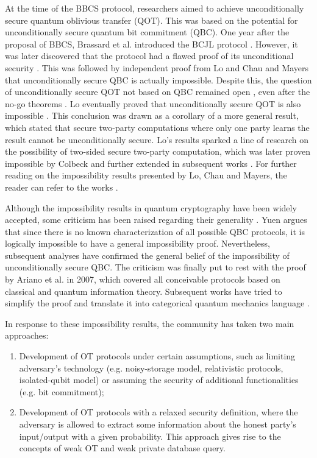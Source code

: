 At the time of the BBCS protocol, researchers aimed to achieve unconditionally secure quantum oblivious transfer (QOT). This was based on the potential for unconditionally secure quantum bit commitment (QBC). One year after the proposal of BBCS, Brassard et al. introduced the BCJL protocol \cite{BCJL93}. However, it was later discovered that the protocol had a flawed proof of its unconditional security \cite{M96}. This was followed by independent proof from Lo and Chau \cite{LC97} and Mayers \cite{M97} that unconditionally secure QBC is actually impossible. Despite this, the question of unconditionally secure QOT not based on QBC remained open \cite{BC96}, even after the no-go theorems \cite{LC97, M97}. Lo eventually proved that unconditionally secure QOT is also impossible \cite{L97}. This conclusion was drawn as a corollary of a more general result, which stated that secure two-party computations where only one party learns the result cannot be unconditionally secure. Lo's results sparked a line of research on the possibility of two-sided secure two-party computation, which was later proven impossible by Colbeck \cite{C07} and further extended in subsequent works \cite{BCS12, SSS14, SJFHV13}. For further reading on the impossibility results presented by Lo, Chau and Mayers, the reader can refer to the works \cite{BCMS97, S99}.

Although the impossibility results in quantum cryptography have been widely accepted, some criticism has been raised regarding their generality \cite{Y00, Y02, Y04, C03}. Yuen \cite{Y00} argues that since there is no known characterization of all possible QBC protocols, it is logically impossible to have a general impossibility proof. Nevertheless, subsequent analyses \cite{B01, C05, Che07} have confirmed the general belief of the impossibility of unconditionally secure QBC. The criticism was finally put to rest with the proof by Ariano et al. \cite{A07} in 2007, which covered all conceivable protocols based on classical and quantum information theory. Subsequent works have tried to simplify the proof \cite{CAP10, CAPSW13, H13} and translate it into categorical quantum mechanics language \cite{K12, SHW20, BK22}.

In response to these impossibility results, the community has taken two main approaches:

\begin{enumerate}
    \item Development of OT protocols under certain assumptions, such as limiting adversary's technology (e.g. noisy-storage model, relativistic protocols, isolated-qubit model) or assuming the security of additional functionalities (e.g. bit commitment);
    \item Development of OT protocols with a relaxed security definition, where the adversary is allowed to extract some information about the honest party's input/output with a given probability. This approach gives rise to the concepts of weak OT and weak private database query.
\end{enumerate}

